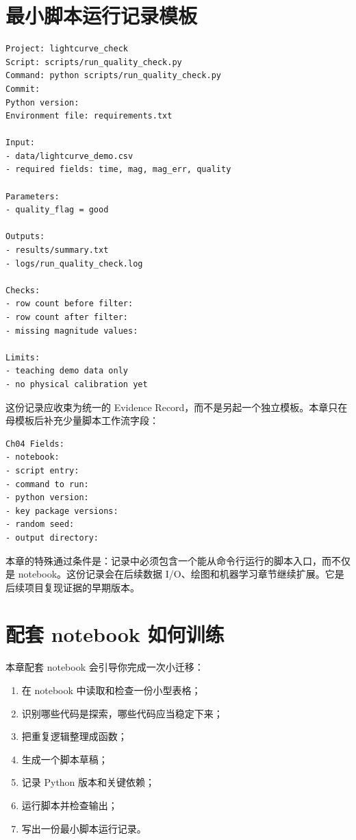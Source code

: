 \section{最小脚本运行记录模板}

\begin{examplebox}[脚本运行记录]
\begin{lstlisting}[style=terminal]
Project: lightcurve_check
Script: scripts/run_quality_check.py
Command: python scripts/run_quality_check.py
Commit:
Python version:
Environment file: requirements.txt

Input:
- data/lightcurve_demo.csv
- required fields: time, mag, mag_err, quality

Parameters:
- quality_flag = good

Outputs:
- results/summary.txt
- logs/run_quality_check.log

Checks:
- row count before filter:
- row count after filter:
- missing magnitude values:

Limits:
- teaching demo data only
- no physical calibration yet
\end{lstlisting}
\end{examplebox}

这份记录应收束为统一的 Evidence Record，而不是另起一个独立模板。本章只在母模板后补充少量脚本工作流字段：

\begin{examplebox}
\begin{lstlisting}[style=terminal]
Ch04 Fields:
- notebook:
- script entry:
- command to run:
- python version:
- key package versions:
- random seed:
- output directory:
\end{lstlisting}
\end{examplebox}

本章的特殊通过条件是：记录中必须包含一个能从命令行运行的脚本入口，而不仅是 notebook。这份记录会在后续数据 I/O、绘图和机器学习章节继续扩展。它是后续项目复现证据的早期版本。

\section{配套 notebook 如何训练}

本章配套 notebook 会引导你完成一次小迁移：

\begin{enumerate}
    \item 在 notebook 中读取和检查一份小型表格；
    \item 识别哪些代码是探索，哪些代码应当稳定下来；
    \item 把重复逻辑整理成函数；
    \item 生成一个脚本草稿；
    \item 记录 Python 版本和关键依赖；
    \item 运行脚本并检查输出；
    \item 写出一份最小脚本运行记录。
\end{enumerate}

